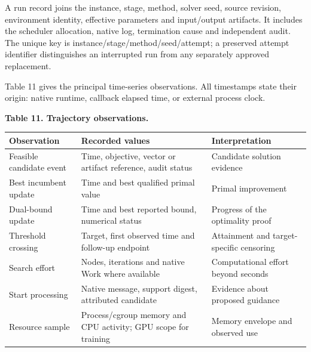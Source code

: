 \documentclass[
  british,
  10pt,
]{article}
\newcounter{none} %
\begin{document}
A run record joins the instance, stage, method, solver seed, source
revision, environment identity, effective parameters and input/output
artifacts. It includes the scheduler allocation, native log, termination
cause and independent audit. The unique key is
instance/stage/method/seed/attempt; a preserved attempt identifier
distinguishes an interrupted run from any separately approved
replacement.

Table 11 gives the principal time-series observations. All timestamps
state their origin: native runtime, callback elapsed time, or external
process clock.


\textbf{Table 11. Trajectory observations.}

{\def\LTcaptype{none} %
\begin{longtable}[]{@{}
  >{\raggedright\arraybackslash}p{}
  >{\raggedright\arraybackslash}p{}
  >{\raggedright\arraybackslash}p{}@{}}
\toprule\noalign{}
\begin{minipage}[b]{\linewidth}\raggedright
Observation
\end{minipage} & \begin{minipage}[b]{\linewidth}\raggedright
Recorded values
\end{minipage} & \begin{minipage}[b]{\linewidth}\raggedright
Interpretation
\end{minipage} \\
\midrule\noalign{}
\endhead
\bottomrule\noalign{}
\endlastfoot
Feasible candidate event & Time, objective, vector or artifact
reference, audit status & Candidate solution evidence \\
Best incumbent update & Time and best qualified primal value & Primal
improvement \\
Dual-bound update & Time and best reported bound, numerical status &
Progress of the optimality proof \\
Threshold crossing & Target, first observed time and follow-up endpoint
& Attainment and target-specific censoring \\
Search effort & Nodes, iterations and native Work where available &
Computational effort beyond seconds \\
Start processing & Native message, support digest, attributed candidate
& Evidence about proposed guidance \\
Resource sample & Process/cgroup memory and CPU activity; GPU scope for
training & Memory envelope and observed use \\
\end{longtable}
}
\end{document}
